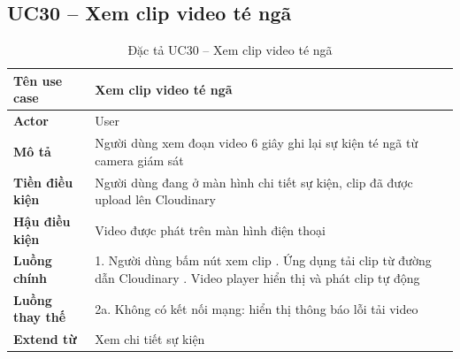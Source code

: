 \subsection*{UC30 -- Xem clip video té ngã}
\begin{table}[H]
    \captionsetup{justification=raggedright, singlelinecheck=false}
    \caption{Đặc tả UC30 -- Xem clip video té ngã}
\centering
\begin{tabular}{|p{3.5cm}|p{10cm}|}
\hline
\textbf{Tên use case} & Xem clip video té ngã \\
\hline
\textbf{Actor} & User \\
\hline
\textbf{Mô tả} & Người dùng xem đoạn video 6 giây ghi lại
  sự kiện té ngã từ camera giám sát \\
\hline
\textbf{Tiền điều kiện} & Người dùng đang ở màn hình chi
  tiết sự kiện, clip đã được upload lên Cloudinary \\
\hline
\textbf{Hậu điều kiện} & Video được phát trên màn hình
  điện thoại \\
\hline
\textbf{Luồng chính} &
  1. Người dùng bấm nút xem clip \newline
  2. Ứng dụng tải clip từ đường dẫn Cloudinary \newline
  3. Video player hiển thị và phát clip tự động \\
\hline
\textbf{Luồng thay thế} &
  2a. Không có kết nối mạng: hiển thị thông báo
  lỗi tải video \\
\hline
\textbf{Extend từ} & Xem chi tiết sự kiện \\
\hline
\end{tabular}

\end{table}


